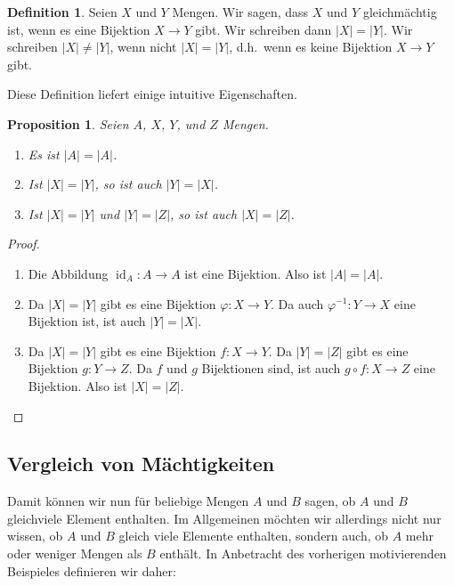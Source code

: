 \documentclass[a4paper,10pt]{article}
\newcounter{propositions}
\newtheorem{prop}[propositions]{Proposition}
\theoremstyle{definition}
\newtheorem*{defi}{Definition}
\DeclareMathOperator{\id}{id}
\begin{document}
\begin{defi}
 Seien $X$ und $Y$ Mengen. Wir sagen, dass $X$ und $Y$ gleichmächtig ist, wenn es eine Bijektion $X \to Y$ gibt. Wir schreiben dann $|X| = |Y|$. Wir schreiben $|X| \neq |Y|$, wenn nicht $|X| = |Y|$, d.h.\ wenn es keine Bijektion $X \to Y$ gibt.
\end{defi}

Diese Definition liefert einige intuitive Eigenschaften.

\begin{prop}
 Seien $A$, $X$, $Y$, und $Z$ Mengen.
 \begin{enumerate}[label=\arabic*), leftmargin=*]
  \item
   Es ist $|A| = |A|$.
  \item
   Ist $|X| = |Y|$, so ist auch $|Y| = |X|$.
  \item
   Ist $|X| = |Y|$ und $|Y| = |Z|$, so ist auch $|X| = |Z|$.
 \end{enumerate}
\end{prop}
\begin{proof}
 \begin{enumerate}[label=\arabic*), leftmargin=*]
  \item
   Die Abbildung $\id_A \colon A \to A$ ist eine Bijektion. Also ist $|A| = |A|$.
   
  \item
   Da $|X| = |Y|$ gibt es eine Bijektion $\varphi \colon X \to Y$. Da auch $\varphi^{-1} \colon Y \to X$ eine Bijektion ist, ist auch $|Y| = |X|$.
   
  \item
   Da $|X| = |Y|$ gibt es eine Bijektion $f \colon X \to Y$. Da $|Y| = |Z|$ gibt es eine Bijektion $g \colon Y \to Z$. Da $f$ und $g$ Bijektionen sind, ist auch $g \circ f \colon X \to Z$ eine Bijektion. Also ist $|X| = |Z|$.
   \qedhere
 \end{enumerate}
\end{proof}



\subsection{Vergleich von Mächtigkeiten}

Damit können wir nun für beliebige Mengen $A$ und $B$ sagen, ob $A$ und $B$ gleichviele Element enthalten. Im Allgemeinen möchten wir allerdings nicht nur wissen, ob $A$ und $B$ gleich viele Elemente enthalten, sondern auch, ob $A$ mehr oder weniger Mengen als $B$ enthält. In Anbetracht des vorherigen motivierenden Beispieles definieren wir daher:
\end{document}
